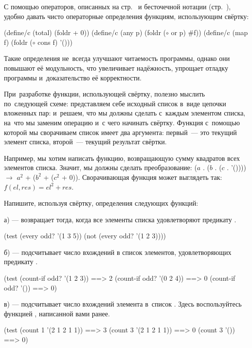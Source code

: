 С помощью операторов, описанных на стр.~\pageref{operators} и бесточечной нотации (стр.~\pageref{tacit}), удобно давать чисто операторные определения функциям, использующим свёртку:

\label{fold:map}
\begin{Definition}[emph={f,p,test?}]
(define/c (total)  (foldr + 0))%
(define/c (any p)  (foldr ($\circ$ or p) #f))%
(define/c (map f)  (foldr ($\circ$ cons f) '()))%
\end{Definition}

Такие определения не~всегда улучшают читаемость программы, однако они повышают её модульность, что увеличивает надёжность, упрощает отладку программы и~доказательство её корректности.

При~разработке функции, использующей свёртку, полезно мыслить по~следующей схеме: представляем себе исходный список в~виде цепочки вложенных пар:  и~решаем, что мы должны сделать с~каждым элементом списка, на~что мы заменим операцию  и~с чего начинать свёртку. Функция с~помощью которой мы сворачиваем список имеет два аргумента: первый~--- это текущий элемент списка, второй~--- текущий результат свёртки.

Например, мы хотим написать функцию, возвращающую сумму квадратов всех элементов списка. Значит, мы должны сделать преобразование: 
\textrm{\normalfont($a$ . ($b$ . ($c$ . '()))) $\rightarrow$  $a^2$ + ($b^2$ + ($c^2$ + 0))}.  
Сворачивающая функция может выглядеть так:  $f(el,res) = el^2+res$.

\begin{Assignment}
Напишите, используя свёртку, определения следующих функций:

 а)  --- возвращает  тогда, когда все элементы списка  удовлетворяют предикату .\vspace{-\smallskipamount}
\begin{Specification}
(test (every odd? '(1 3 5))
      (not (every odd? '(1 2 3))))
\end{Specification}

 б)  --- подсчитывает число вхождений в список  элементов, удовлетворяющих предикату .\vspace{-\smallskipamount}
\begin{Specification}
(test (count-if odd? '(1 2 3))  ==> 2
      (count-if odd? '(0 2 4))  ==> 0
      (count-if odd? '())       ==> 0)
\end{Specification}

 в)  --- подсчитывает число вхождений элемента  в~список . Здесь воспользуйтесь функцией , написанной вами ранее. \vspace{-\smallskipamount}
\begin{Specification}
(test (count 1 '(2 1 2 1 1))  ==> 3
      (count 3 '(2 1 2 1 1))  ==> 0
      (count 3 '())           ==> 0)
\end{Specification}
\end{Assignment}

